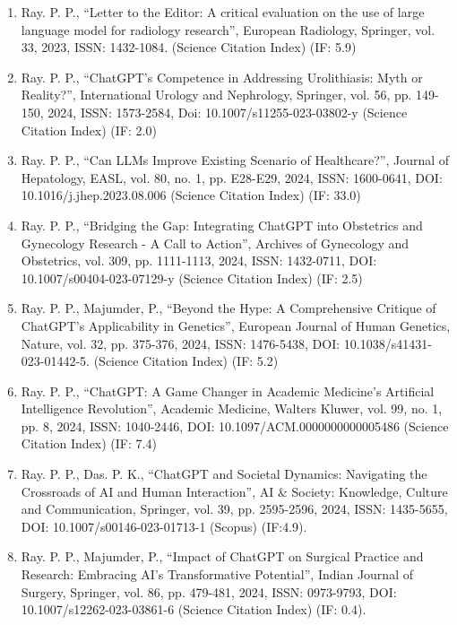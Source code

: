 \documentclass[11pt,a4paper]{moderncv}
\begin{document}
\begin{adjustwidth}{6em}{0pt}
\begin{enumerate}
		\item Ray. P. P., “Letter to the Editor: A critical evaluation on the use of large language model for radiology research”, European Radiology, Springer, vol. 33, 2023, ISSN: 1432-1084. (Science Citation Index) (IF: 5.9)
		
		\item Ray. P. P., “ChatGPT’s Competence in Addressing Urolithiasis: Myth or Reality?”, International Urology and Nephrology, Springer, vol. 56, pp. 149-150, 2024, ISSN: 1573-2584, Doi: 10.1007/s11255-023-03802-y (Science Citation Index) (IF: 2.0)
		
		\item Ray. P. P., “Can LLMs Improve Existing Scenario of Healthcare?”, Journal of Hepatology, EASL, vol. 80, no. 1, pp. E28-E29, 2024, ISSN: 1600-0641, DOI: 10.1016/j.jhep.2023.08.006 (Science Citation Index) (IF: 33.0)
		
		\item Ray. P. P., “Bridging the Gap: Integrating ChatGPT into Obstetrics and Gynecology Research - A Call to Action”, Archives of Gynecology and Obstetrics, vol. 309, pp. 1111-1113, 2024, ISSN: 1432-0711, DOI: 10.1007/s00404-023-07129-y (Science Citation Index) (IF: 2.5)
		
		\item Ray. P. P., Majumder, P., “Beyond the Hype: A Comprehensive Critique of ChatGPT’s Applicability in Genetics”, European Journal of Human Genetics, Nature, vol. 32, pp. 375-376, 2024, ISSN: 1476-5438, DOI: 10.1038/s41431-023-01442-5. (Science Citation Index) (IF: 5.2)
		
		\item Ray. P. P., “ChatGPT: A Game Changer in Academic Medicine's Artificial Intelligence Revolution”, Academic Medicine, Walters Kluwer, vol. 99, no. 1, pp. 8, 2024, ISSN: 1040-2446, DOI: 10.1097/ACM.0000000000005486 (Science Citation Index) (IF: 7.4)
		
		\item Ray. P. P., Das. P. K., “ChatGPT and Societal Dynamics: Navigating the Crossroads of AI and Human Interaction”, AI \& Society: Knowledge, Culture and Communication, Springer, vol. 39, pp. 2595-2596, 2024, ISSN: 1435-5655, DOI: 10.1007/s00146-023-01713-1 (Scopus) (IF:4.9). 
		
		\item 	Ray. P. P., Majumder, P., “Impact of ChatGPT on Surgical Practice and Research: Embracing AI's Transformative Potential”, Indian Journal of Surgery, Springer, vol. 86, pp. 479-481, 2024, ISSN: 0973-9793, DOI: 10.1007/s12262-023-03861-6 (Science Citation Index) (IF: 0.4). 
		

\end{enumerate}
\end{adjustwidth}
\end{document}
